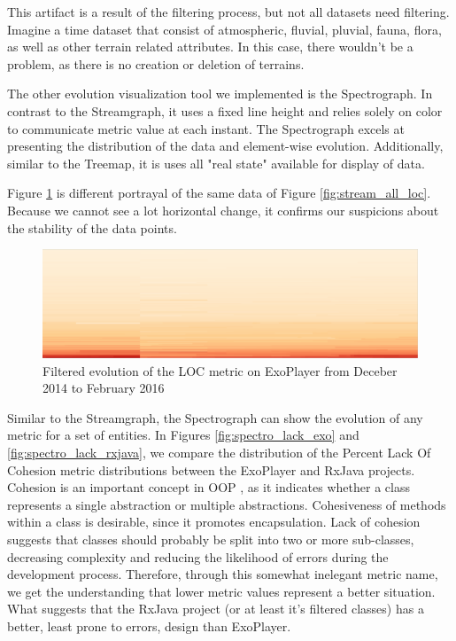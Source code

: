 This artifact is a result of the filtering process, but not all datasets need filtering. Imagine a time dataset that consist of atmospheric, fluvial, pluvial, fauna, flora, as well as other terrain related attributes. In this case, there wouldn't be a problem, as there is no creation or deletion of terrains.

The other evolution visualization tool we implemented is the Spectrograph. In contrast to the Streamgraph, it uses a fixed line height and relies solely on color to communicate metric value at each instant. The Spectrograph excels at presenting the distribution of the data and element-wise evolution. Additionally, similar to the Treemap, it is uses all "real state" available for display of data.

Figure \ref{fig:spectro_exo} is different portrayal of the same data of Figure \ref{fig:stream_all_loc}. Because we cannot see a lot horizontal change, it confirms our suspicions about the stability of the data points.

\begin{figure}[H]
  \centering
  \includegraphics[width=1.0\textwidth]{figures/spectro_exo.png}
  \caption{Filtered evolution of the LOC metric on ExoPlayer from Deceber 2014 to February 2016}
  \label{fig:spectro_exo}
\end{figure}

Similar to the Streamgraph, the Spectrograph can show the evolution of any metric for a set of entities. In Figures \ref{fig:spectro_lack_exo} and \ref{fig:spectro_lack_rxjava}, we compare the distribution of the Percent Lack Of Cohesion metric distributions between the ExoPlayer and RxJava projects. Cohesion is an important concept in OOP \cite{chidamber1994}, as it indicates whether a class represents a single abstraction or multiple abstractions. Cohesiveness of methods within a class is desirable, since it promotes encapsulation. Lack of cohesion suggests that classes should probably be split into two or more sub-classes, decreasing complexity and reducing the likelihood of errors during the development process. Therefore, through this somewhat inelegant metric name, we get the understanding that lower metric values represent a better situation. What suggests that the RxJava project (or at least it's filtered classes) has a better, least prone to errors, design than ExoPlayer.

